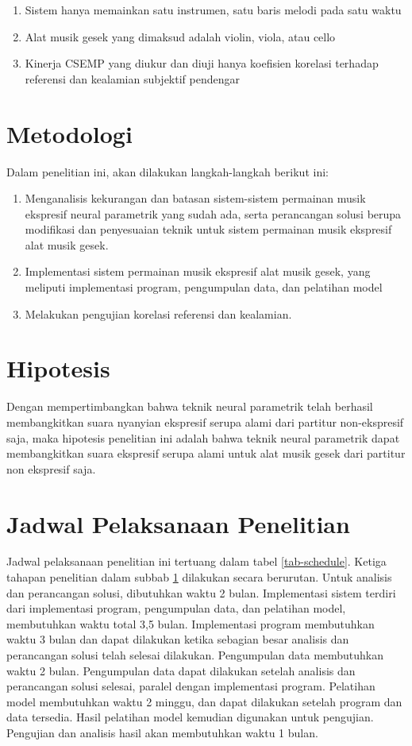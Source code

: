 \begin{enumerate}
	\item Sistem hanya memainkan satu instrumen, satu baris melodi pada satu waktu
	\item Alat musik gesek yang dimaksud adalah violin, viola, atau cello
	\item Kinerja CSEMP yang diukur dan diuji hanya koefisien korelasi terhadap referensi dan kealamian subjektif pendengar
\end{enumerate}

\section{Metodologi} \label{methodology}

Dalam penelitian ini, akan dilakukan langkah-langkah berikut ini:
\begin{enumerate}
	\item Menganalisis kekurangan dan batasan sistem-sistem permainan musik ekspresif neural parametrik yang sudah ada, serta perancangan solusi berupa modifikasi dan penyesuaian teknik untuk sistem permainan musik ekspresif alat musik gesek.
	\item Implementasi sistem permainan musik ekspresif alat musik gesek, yang meliputi implementasi program, pengumpulan data, dan pelatihan model
	\item Melakukan pengujian korelasi referensi dan kealamian.
\end{enumerate}

\section{Hipotesis}

Dengan mempertimbangkan bahwa teknik neural parametrik telah berhasil membangkitkan suara nyanyian ekspresif serupa alami dari partitur non-ekspresif saja, maka hipotesis penelitian ini adalah bahwa teknik neural parametrik dapat membangkitkan suara ekspresif serupa alami untuk alat musik gesek dari partitur non ekspresif saja.

\section{Jadwal Pelaksanaan Penelitian}

Jadwal pelaksanaan penelitian ini tertuang dalam tabel \ref{tab-schedule}. Ketiga tahapan penelitian dalam subbab \ref{methodology} dilakukan secara berurutan. Untuk analisis dan perancangan solusi, dibutuhkan waktu 2 bulan.  Implementasi sistem terdiri dari implementasi program, pengumpulan data, dan pelatihan model, membutuhkan waktu total 3,5 bulan. Implementasi program membutuhkan waktu 3 bulan dan dapat dilakukan ketika sebagian besar analisis dan perancangan solusi telah selesai dilakukan. Pengumpulan data membutuhkan waktu 2 bulan. Pengumpulan data dapat dilakukan setelah analisis dan perancangan solusi selesai, paralel dengan implementasi program. Pelatihan model membutuhkan waktu 2 minggu, dan dapat dilakukan setelah program dan data tersedia. Hasil pelatihan model kemudian digunakan untuk pengujian. Pengujian dan analisis hasil akan membutuhkan waktu 1 bulan.

